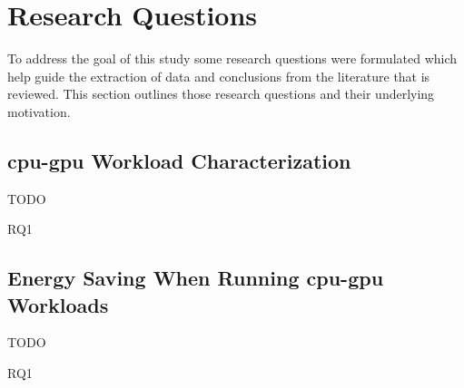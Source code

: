\section{Research Questions}
    To address the goal of this study some research questions were formulated which help guide the extraction of data and conclusions from the literature that is reviewed.
    This section outlines those research questions and their underlying motivation.
    
	\subsection{\acrshort{cpu}-\acrshort{gpu} Workload Characterization}
		TODO

        \begin{aligneddescription}{RQ1}
            \item[RQ1] \rqOne
            \item[RQ2] \rqTwo
		\end{aligneddescription}

	\subsection{Energy Saving When Running \acrshort{cpu}-\acrshort{gpu} Workloads}
		TODO

        \begin{aligneddescription}{RQ1}
            \item[RQ3] \rqThree
		\end{aligneddescription}